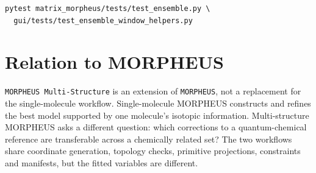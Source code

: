 \documentclass[11pt]{article}
\newcommand{\program}{\texttt{MORPHEUS Multi-Structure}}
\newcommand{\morpheus}{\texttt{MORPHEUS}}
\begin{document}
\begin{lstlisting}[style=oracle]
pytest matrix_morpheus/tests/test_ensemble.py \
  gui/tests/test_ensemble_window_helpers.py
\end{lstlisting}

\section{Relation to MORPHEUS}

\program{} is an extension of \morpheus{}, not a replacement for the
single-molecule workflow.  Single-molecule MORPHEUS constructs and refines the
best model supported by one molecule's isotopic information.  Multi-structure
MORPHEUS asks a different question: which corrections to a quantum-chemical
reference are transferable across a chemically related set?  The two workflows
share coordinate generation, topology checks, primitive projections,
constraints and manifests, but the fitted variables are different.
\end{document}
